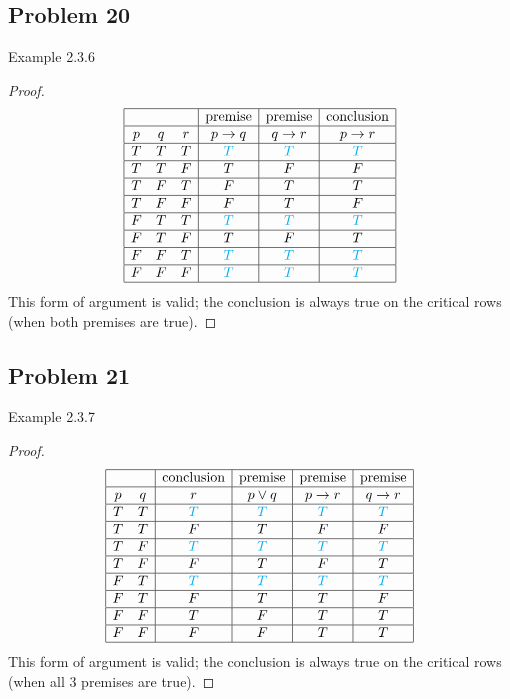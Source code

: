 \documentclass[14pt]{extarticle}
\begin{document}
\subsection{Problem 20}
Example 2.3.6

\begin{proof}
$$
\begin{array}{|ccc|c|c|c|}
\hline
& & & \text{premise} & \text{premise} & \text{conclusion} \\
\hline
p & q & r & p \to q & q \to r & p \to r \\
\hline
T & T & T & \color{cyan} T & \color{cyan} T & \color{cyan} T \\
\hline
T & T & F & T & F & F \\
\hline
T & F & T & F & T & T \\
\hline
T & F & F & F & T & F \\
\hline
F & T & T & \color{cyan} T & \color{cyan} T & \color{cyan} T \\
\hline
F & T & F & T & F & T \\
\hline
F & F & T & \color{cyan} T & \color{cyan} T & \color{cyan} T \\
\hline
F & F & F & \color{cyan} T & \color{cyan} T & \color{cyan} T \\
\hline
\end{array}
$$
This form of argument is valid; the conclusion is always true on the critical
rows (when both premises are true).
\end{proof}

\subsection{Problem 21}
Example 2.3.7

\begin{proof}
$$
\begin{array}{|cc|c|c|c|c|}
\hline
& & \text{conclusion} & \text{premise} & \text{premise} & \text{premise} \\
\hline
p & q & r & p \vee q & p \to r & q \to r \\
\hline
T & T & \color{cyan} T & \color{cyan} T & \color{cyan} T & \color{cyan} T \\
\hline
T & T & F & T & F & F \\
\hline
T & F & \color{cyan} T & \color{cyan} T & \color{cyan} T & \color{cyan} T \\
\hline
T & F & F & T & F & T \\
\hline
F & T & \color{cyan} T & \color{cyan} T & \color{cyan} T & \color{cyan} T \\
\hline
F & T & F & T & T & F \\
\hline
F & F & T & F & T & T \\
\hline
F & F & F & F & T & T \\
\hline
\end{array}
$$
This form of argument is valid; the conclusion is always true on the critical
rows (when all 3 premises are true).
\end{proof}
\end{document}
